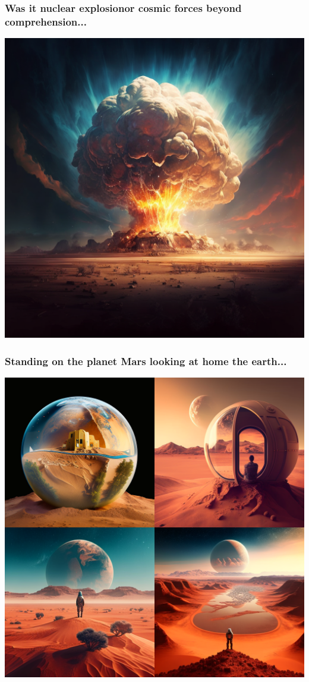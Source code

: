 \documentclass[9pt,table,xcolor=dvipsnames]{beamer}%
\theoremstyle{definition}
\theoremstyle{plain}
\begin{document}
\begin{frame}[fragile,t] %
  \frametitle{Was it nuclear explosionor cosmic forces beyond comprehension...}
  \begin{center}
    \includegraphics[scale=0.22]{./figs/chenle02_Was_it_nuclear_explosionor_cosmic_forces_beyond_comprehension.png}
  \end{center}
\end{frame}
\begin{frame}[fragile,t] %
  \frametitle{Standing on the planet Mars looking at home the earth...}
  \begin{center}
    \includegraphics[scale=0.22]{./figs/chenle02_Standing_on_the_planet_Mars_looking_at_home_the_earth.png}
  \end{center}
\end{frame}
\end{document}
